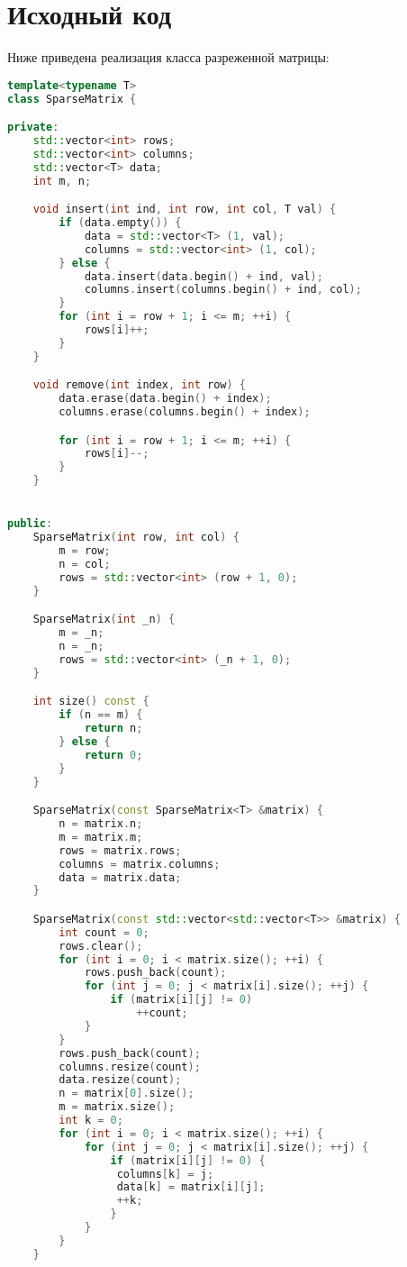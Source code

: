 \section{Исходный код}

Ниже приведена реализация класса разреженной матрицы:

\begin{lstlisting}[language=C++]
template<typename T>
class SparseMatrix {

private:
    std::vector<int> rows;
    std::vector<int> columns;
    std::vector<T> data;
    int m, n;

    void insert(int ind, int row, int col, T val) {
        if (data.empty()) {
            data = std::vector<T> (1, val);
            columns = std::vector<int> (1, col);
        } else {
            data.insert(data.begin() + ind, val);
            columns.insert(columns.begin() + ind, col);
        }
        for (int i = row + 1; i <= m; ++i) {
            rows[i]++;
        }
    }

    void remove(int index, int row) {
        data.erase(data.begin() + index);
        columns.erase(columns.begin() + index);

        for (int i = row + 1; i <= m; ++i) {
            rows[i]--;
        }
    }


public:
    SparseMatrix(int row, int col) {
        m = row;
        n = col;
        rows = std::vector<int> (row + 1, 0);
    }

    SparseMatrix(int _n) {
        m = _n;
        n = _n;
        rows = std::vector<int> (_n + 1, 0);
    }

    int size() const {
        if (n == m) {
            return n;
        } else {
            return 0;
        }
    }

    SparseMatrix(const SparseMatrix<T> &matrix) {
        n = matrix.n;
        m = matrix.m;
        rows = matrix.rows;
        columns = matrix.columns;
        data = matrix.data;
    }

    SparseMatrix(const std::vector<std::vector<T>> &matrix) {
        int count = 0;
        rows.clear();
        for (int i = 0; i < matrix.size(); ++i) {
            rows.push_back(count);
            for (int j = 0; j < matrix[i].size(); ++j) {
                if (matrix[i][j] != 0)
                    ++count;
            }
        }
        rows.push_back(count);
        columns.resize(count);
        data.resize(count);
        n = matrix[0].size();
        m = matrix.size();
        int k = 0;
        for (int i = 0; i < matrix.size(); ++i) {
            for (int j = 0; j < matrix[i].size(); ++j) {
                if (matrix[i][j] != 0) {
                 columns[k] = j;
                 data[k] = matrix[i][j];
                 ++k;
                }
            }
        }
    }


\end{lstlisting}
